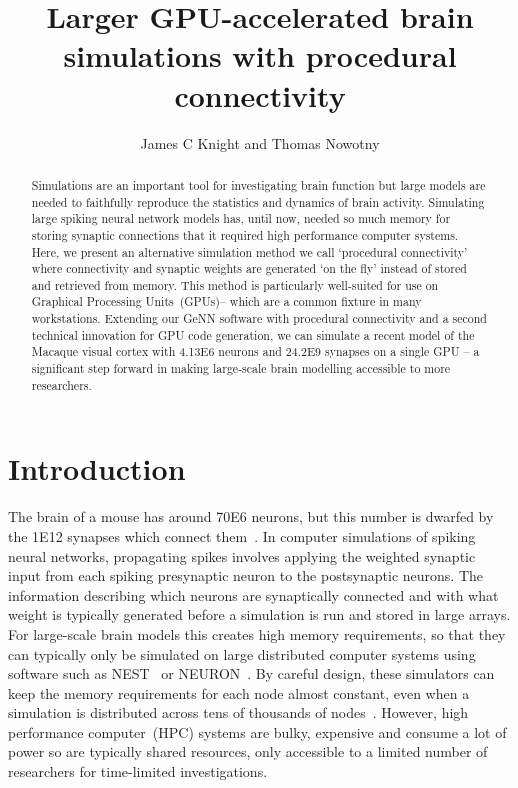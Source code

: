 \documentclass[9pt,a4paper]{amsart}
\title{Larger GPU-accelerated brain simulations with procedural connectivity}
\author{James C Knight and Thomas Nowotny}
\newcommand{\todo}[1]{\textbf{\textsc{\textcolor{red}{(TODO: #1)}}}}
\begin{document}
\begin{abstract}
Simulations are an important tool for investigating brain function but large models are needed to faithfully reproduce the statistics and dynamics of brain activity.
Simulating large spiking neural network models has, until now, needed so much memory for storing synaptic connections that it required high performance computer systems.
Here, we present an alternative simulation method we call `procedural connectivity' where connectivity and synaptic weights are generated `on the fly' instead of stored and retrieved from memory.
This method is particularly well-suited for use on Graphical Processing Units~(GPUs)-- which are a common fixture in many workstations.
Extending our GeNN software with procedural connectivity and a second technical innovation for GPU code generation, we can simulate a recent model of the Macaque visual cortex with \num{4.13E6} neurons and \num{24.2E9} synapses on a single GPU -- a significant step forward in making large-scale brain modelling accessible to more researchers.
\end{abstract}
\maketitle
\section{Introduction}
The brain of a mouse has around \num{70E6} neurons, but this number is dwarfed by the \num{1E12} synapses which connect them~\citep{Herculano-Houzel2010}.
In computer simulations of spiking neural networks, propagating spikes involves  applying the weighted synaptic input from each spiking presynaptic neuron to the postsynaptic neurons.
The information describing which neurons are synaptically connected and with what weight is typically generated before a simulation is run and stored in large arrays. 
For large-scale brain models this creates high memory requirements, so that they can typically only be simulated on large distributed computer systems using software such as NEST~\citep{Gewaltig2007} or NEURON~\citep{carnevale2006neuron}.
By careful design, these simulators can keep the memory requirements for each node almost constant, even when a simulation is distributed across tens of thousands of nodes~\citep{Jordan2018}.
However, high performance computer~(HPC) systems are bulky, expensive and consume a lot of power so are typically shared resources, only accessible to a limited number of researchers for time-limited investigations.
\end{document}
